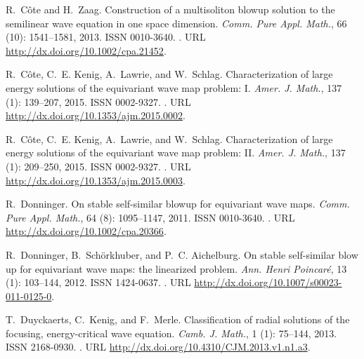 \documentclass[11pt]{aims}
\theoremstyle{definition}
\numberwithin{equation}{section}
\begin{document}
\begin{thebibliography}{62}
R.~C{\^o}te and H.~Zaag.
\newblock Construction of a multisoliton blowup solution to the semilinear wave
  equation in one space dimension.
\newblock \emph{Comm. Pure Appl. Math.}, 66 (10): 1541--1581,
  2013.
\newblock ISSN 0010-3640.
\newblock {}.
\newblock URL \url{http://dx.doi.org/10.1002/cpa.21452}.

R.~C\^ote, C.~E. Kenig, A.~Lawrie, and W.~Schlag.
\newblock Characterization of large energy solutions of the equivariant wave
  map problem: {I}.
\newblock \emph{Amer. J. Math.}, 137 (1): 139--207,
  2015{}.
\newblock ISSN 0002-9327.
\newblock {}.
\newblock URL \url{http://dx.doi.org/10.1353/ajm.2015.0002}.

R.~C\^ote, C.~E. Kenig, A.~Lawrie, and W.~Schlag.
\newblock Characterization of large energy solutions of the equivariant wave
  map problem: {II}.
\newblock \emph{Amer. J. Math.}, 137 (1): 209--250,
  2015{}.
\newblock ISSN 0002-9327.
\newblock {}.
\newblock URL \url{http://dx.doi.org/10.1353/ajm.2015.0003}.

R.~Donninger.
\newblock On stable self-similar blowup for equivariant wave maps.
\newblock \emph{Comm. Pure Appl. Math.}, 64 (8): 1095--1147,
  2011.
\newblock ISSN 0010-3640.
\newblock {}.
\newblock URL \url{http://dx.doi.org/10.1002/cpa.20366}.

R.~Donninger, B.~Sch\"orkhuber, and P.~C. Aichelburg.
\newblock On stable self-similar blow up for equivariant wave maps: the
  linearized problem.
\newblock \emph{Ann. Henri Poincar\'e}, 13 (1): 103--144,
  2012.
\newblock ISSN 1424-0637.
\newblock {}.
\newblock URL \url{http://dx.doi.org/10.1007/s00023-011-0125-0}.

T.~Duyckaerts, C.~Kenig, and F.~Merle.
\newblock Classification of radial solutions of the focusing, energy-critical
  wave equation.
\newblock \emph{Camb. J. Math.}, 1 (1): 75--144, 2013.
\newblock ISSN 2168-0930.
\newblock {}.
\newblock URL \url{http://dx.doi.org/10.4310/CJM.2013.v1.n1.a3}.


\end{thebibliography}
\end{document}
